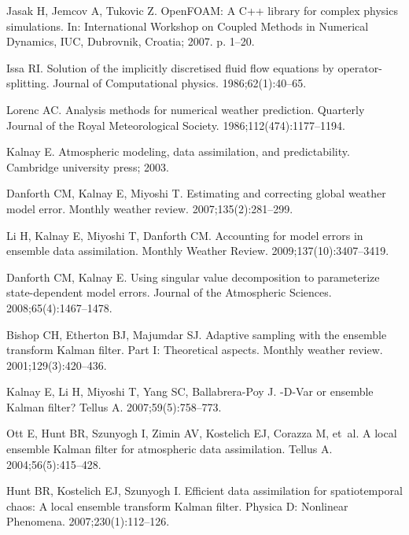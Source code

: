 \documentclass[10pt,letterpaper]{article}
\begin{document}
\begin{thebibliography}{10}
Jasak H, Jemcov A, Tukovic Z.
\newblock OpenFOAM: A C++ library for complex physics simulations.
\newblock In: International Workshop on Coupled Methods in Numerical Dynamics,
  IUC, Dubrovnik, Croatia; 2007. p. 1--20.

Issa RI.
\newblock Solution of the implicitly discretised fluid flow equations by
  operator-splitting.
\newblock Journal of Computational physics. 1986;62(1):40--65.

Lorenc AC.
\newblock Analysis methods for numerical weather prediction.
\newblock Quarterly Journal of the Royal Meteorological Society.
  1986;112(474):1177--1194.

Kalnay E.
\newblock Atmospheric modeling, data assimilation, and predictability.
\newblock Cambridge university press; 2003.

Danforth CM, Kalnay E, Miyoshi T.
\newblock Estimating and correcting global weather model error.
\newblock Monthly weather review. 2007;135(2):281--299.

Li H, Kalnay E, Miyoshi T, Danforth CM.
\newblock Accounting for model errors in ensemble data assimilation.
\newblock Monthly Weather Review. 2009;137(10):3407--3419.

Danforth CM, Kalnay E.
\newblock Using singular value decomposition to parameterize state-dependent
  model errors.
\newblock Journal of the Atmospheric Sciences. 2008;65(4):1467--1478.

Bishop CH, Etherton BJ, Majumdar SJ.
\newblock Adaptive sampling with the ensemble transform Kalman filter. Part I:
  Theoretical aspects.
\newblock Monthly weather review. 2001;129(3):420--436.

Kalnay E, Li H, Miyoshi T, Yang SC, Ballabrera-Poy J.
-D-Var or ensemble Kalman filter?
\newblock Tellus A. 2007;59(5):758--773.

Ott E, Hunt BR, Szunyogh I, Zimin AV, Kostelich EJ, Corazza M, et~al.
\newblock A local ensemble Kalman filter for atmospheric data assimilation.
\newblock Tellus A. 2004;56(5):415--428.

Hunt BR, Kostelich EJ, Szunyogh I.
\newblock Efficient data assimilation for spatiotemporal chaos: A local
  ensemble transform Kalman filter.
\newblock Physica D: Nonlinear Phenomena. 2007;230(1):112--126.


\end{thebibliography}
\end{document}

